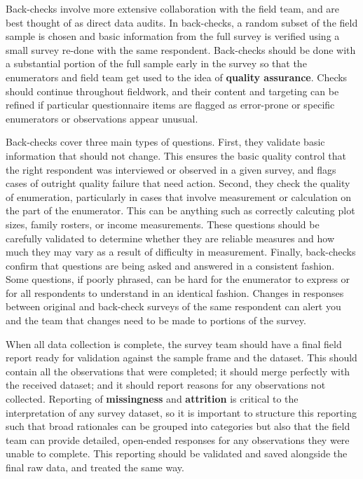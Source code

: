 Back-checks
involve more extensive collaboration with the field team,
and are best thought of as direct data audits.
In back-checks, a random subset of the field sample is chosen
and basic information from the full survey is verified
using a small survey re-done with the same respondent.
Back-checks should be done with a substantial portion
of the full sample early in the survey
so that the enumerators and field team
get used to the idea of \textbf{quality assurance}.
Checks should continue throughout fieldwork,
and their content and targeting can be refined if particular
questionnaire items are flagged as error-prone
or specific enumerators or observations appear unusual.

Back-checks cover three main types of questions.
First, they validate basic information that should not change.
This ensures the basic quality control that the right respondent
was interviewed or observed in a given survey,
and flags cases of outright quality failure that need action.
Second, they check the quality of enumeration,
particularly in cases that involve measurement or calculation
on the part of the enumerator.
This can be anything such as correctly calcuting plot sizes,
family rosters, or income measurements.
These questions should be carefully validated
to determine whether they are reliable measures
and how much they may vary as a result of difficulty in measurement.
Finally, back-checks confirm that questions are being asked and answered
in a consistent fashion. Some questions, if poorly phrased,
can be hard for the enumerator to express or for all respondents
to understand in an identical fashion.
Changes in responses between original and back-check surveys
of the same respondent
can alert you and the team that changes need to be made
to portions of the survey.

When all data collection is complete,
the survey team should have a final field report
ready for validation against the sample frame and the dataset.
This should contain all the observations that were completed;
it should merge perfectly with the received dataset;
and it should report reasons for any observations not collected.
Reporting of \textbf{missingness} and \textbf{attrition} is critical
to the interpretation of any survey dataset,
so it is important to structure this reporting
such that broad rationales can be grouped into categories
but also that the field team can provide detailed, open-ended responses
for any observations they were unable to complete.
This reporting should be validated and saved
alongside the final raw data, and treated the same way.


